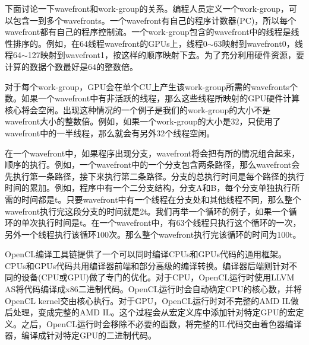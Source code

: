 下面讨论一下wavefront和work-group的关系。编程人员定义一个work-group，可以包含一到多个wavefronts。一个wavefront有自己的程序计数器(PC)，所以每个wavefront都有自己的程序控制流。一个work-group包含的wavefront中的线程是线性排序的。例如，在64线程wavefront的GPUs上，线程0$\sim$63映射到wavefront0，线程64$\sim$127映射到wavefront1，按这样的顺序映射下去。为了充分利用硬件资源，要计算的数据个数最好是64的整数倍。

对于每个work-group，GPU会在单个CU上产生该work-group所需的wavefronts个数。如果一个wavefront中有非活跃的线程，那么这些线程所映射的GPU硬件计算核心将会空闲。出现这种情况的一个例子是我们的work-group的大小不是wavefront大小的整数倍。例如，如果一个work-group的大小是32，只使用了wavefront中的一半线程，那么就会有另外32个线程空闲。

在一个wavefront中，如果程序出现分支，wavefront将会把有所的情况组合起来，顺序的执行。例如，一个wavefront中的一个分支包含两条路径，那么wavefront会先执行第一条路径，接下来执行第二条路径。分支的总执行时间是每个路径的执行时间的累加。例如，程序中有一个二分支结构，分支A和B，每个分支单独执行所需的时间都是t。只要wavefront中有一个线程在分支处和其他线程不同，那么整个wavefront执行完这段分支的时间就是2t。我们再举一个循环的例子，如果一个循环的单次执行时间是t。在一个wavefront中，有63个线程只执行这个循环的一次，另外一个线程执行该循环100次。那么整个wavefront执行完该循环的时间为100t。

OpenCL编译工具链提供了一个可以同时编译CPUs和GPUs代码的通用框架。CPUs和GPUs代码共用编译器前端和部分高级的编译转换。编译器后端则针对不同的设备(CPU或GPU)做了专门的优化。对于CPU，OpenCL运行时使用LLVM AS将代码编译成x86二进制代码。OpenCL运行时会自动确定CPU的核心数，并将OpenCL kernel交由核心执行。对于GPU，OpenCL运行时对不完整的AMD IL做后处理，变成完整的AMD IL。这个过程会从宏定义库中添加针对特定GPU的宏定义。之后，OpenCL运行时会移除不必要的函数，将完整的IL代码交由着色器编译器，编译成针对特定GPU的二进制代码。

%


